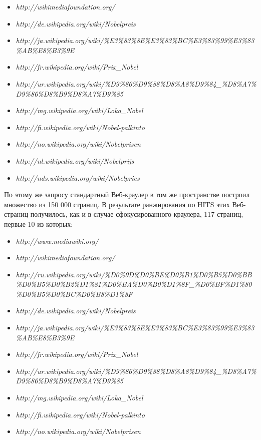 \begin{itemize}
	\item \textit{http://wikimediafoundation.org/}
	\item \textit{http://de.wikipedia.org/wiki/Nobelpreis}
	\item \textit{http://ja.wikipedia.org/wiki/\%E3\%83\%8E\linebreak\%E3\%83\%BC\%E3\%83\%99\%E3\%83\%AB\%E8\%B3\%9E}
	\item \textit{http://fr.wikipedia.org/wiki/Prix\_Nobel}
	\item \textit{http://ur.wikipedia.org/wiki/\%D9\%86\%D9\%88\%D8\%A8\linebreak\%D9\%84\_\%D8\%A7\%D9\%86\%D8\%B9\%D8\%A7\%D9\%85}
	\item \textit{http://mg.wikipedia.org/wiki/Loka\_Nobel}
	\item \textit{http://fi.wikipedia.org/wiki/Nobel-palkinto} 
	\item \textit{http://no.wikipedia.org/wiki/Nobelprisen}
	\item \textit{http://nl.wikipedia.org/wiki/Nobelprijs}
	\item \textit{http://nds.wikipedia.org/wiki/Nobelpries}
\end{itemize}

По этому же запросу стандартный Веб-краулер в том же пространстве построил множество из 150 000 страниц. В результате ранжирования по HITS этих Веб-страниц получилось, как и в случае сфокусированного краулера, 117 страниц, первые 10 из которых:

\begin{itemize}
	\item \textit{http://www.mediawiki.org/}
	\item \textit{http://wikimediafoundation.org/}
	\item \textit{http://ru.wikipedia.org/wiki/\%D0\%9D\%D0\%BE\%D0\%B1\linebreak\%D0\%B5\%D0\%BB\%D0\%B5\%D0\%B2\%D1\%81\%D0\%BA\%D0\%B0\linebreak\%D1\%8F\_\%D0\%BF\%D1\%80\%D0\%B5\%D0\%BC\%D0\%B8\%D1\%8F}
	\item \textit{http://de.wikipedia.org/wiki/Nobelpreis}
	\item \textit{http://ja.wikipedia.org/wiki/\%E3\%83\linebreak\%8E\%E3\%83\%BC\%E3\%83\%99\%E3\%83\%AB\%E8\%B3\%9E}
	\item \textit{http://fr.wikipedia.org/wiki/Prix\_Nobel}
	\item \textit{http://ur.wikipedia.org/wiki/\%D9\%86\%D9\linebreak\%88\%D8\%A8\%D9\%84\_\%D8\%A7\%D9\%86\%D8\%B9\%D8\%A7\%D9\%85}
	\item \textit{http://mg.wikipedia.org/wiki/Loka\_Nobel}
	\item \textit{http://fi.wikipedia.org/wiki/Nobel-palkinto} 
	\item \textit{http://no.wikipedia.org/wiki/Nobelprisen}
\end{itemize}

